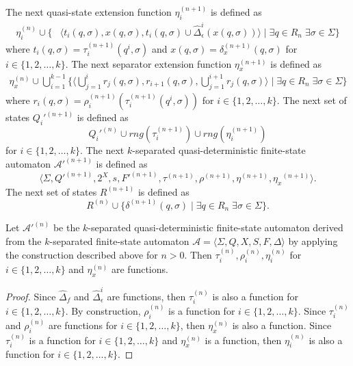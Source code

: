 The next quasi-state extension function $\eta_i^{(n+1)}$ is defined as
\begin{align*}
  \eta_i^{(n)} \cup
    \{ &\langle t_i(q, \sigma), x(q, \sigma), t_i(q, \sigma) \cup
    \hat{\Delta}_\epsilon^i(x(q, \sigma)) \rangle \mid \exists q \in R_n \; \exists
    \sigma \in \Sigma \}
\end{align*}
where $t_i(q, \sigma) = \tau_i^{(n+1)}(q^i, \sigma)$ and $x(q, \sigma) =
\delta_x^{(n+1)}(q, \sigma)$ for $i \in \{ 1, 2, \ldots, k \}$.
The next separator extension function $\eta_x^{(n+1)}$ is defined as
\begin{align*}
  \eta_x^{(n)} \cup \bigcup_{i=1}^{k-1}
    \{ \langle \bigcup_{j=1}^i r_j(q, \sigma), r_{i+1}(q, \sigma),
    \bigcup_{j=1}^{i+1} r_j(q, \sigma)
    \rangle \mid \exists q \in R_n \; \exists \sigma \in \Sigma \}
\end{align*}
where $r_i(q, \sigma) = \rho_i^{(n+1)}(\tau_i^{(n+1)}(q^i, \sigma))$ for $i \in \{
1, 2, \ldots, k \}$.
The next set of states $Q_i'^{(n+1)}$ is defined as
\begin{equation*}
  Q_i'^{(n)} \cup rng(\tau_i^{(n+1)}) \cup rng(\eta_i^{(n+1)})
\end{equation*}
for $i \in \{ 1, 2, \ldots, k \}$.
The next $k$-separated quasi-deterministic finite-state automaton
$\mathcal{A}'^{(n+1)}$ is defined as
\begin{equation*}
  \langle \Sigma, Q'^{(n+1)}, 2^X, s, F'^{(n+1)}, \tau^{(n+1)}, \rho^{(n+1)},
  \eta^{(n+1)}, {\eta_x}^{(n+1)} \rangle.
\end{equation*}
The next set of states $R^{(n+1)}$ is defined as
\begin{equation*}
  R^{(n)} \cup \{ \delta^{(n+1)}(q, \sigma) \mid \exists q \in R_n \; \exists
  \sigma \in \Sigma \}.
\end{equation*}

\begin{proposition}
  Let $\mathcal{A}'^{(n)}$ be the $k$-separated quasi-deterministic finite-state
  automaton derived from the $k$-separated finite-state automaton $\mathcal{A} =
  \langle \Sigma, Q, X, S, F, \Delta \rangle$ by applying the construction described
  above for $n > 0$. Then $\tau_i^{(n)}, \rho_i^{(n)}, \eta_i^{(n)}$ for $i \in \{ 1,
  2, \ldots, k \}$ and $\eta_x^{(n)}$ are functions.
\end{proposition}

\begin{proof}
  Since $\hat{\Delta}_f$ and $\hat{\Delta}_\epsilon^i$ are functions, then
  $\tau_i^{(n)}$ is also a function for $i \in \{ 1, 2, \ldots, k \}$. By
  construction, $\rho_i^{(n)}$ is a function for $i \in \{ 1, 2, \ldots, k \}$. Since
  $\tau_i^{(n)}$ and $\rho_i^{(n)}$ are functions for $i \in \{ 1, 2, \ldots, k \}$,
  then $\eta_x^{(n)}$ is also a function. Since $\tau_i^{(n)}$ is a function for $i
  \in \{ 1, 2, \ldots, k \}$ and $\eta_x^{(n)}$ is a function, then $\eta_i^{(n)}$
  is also a function for $i \in \{ 1, 2, \ldots, k \}$.
\end{proof}

